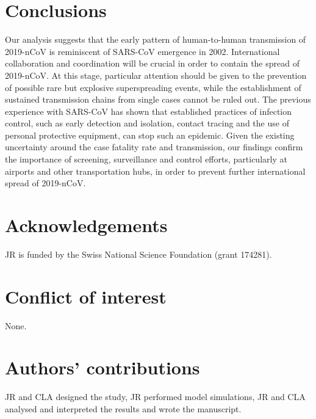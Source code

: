 \documentclass{article}
\begin{document}
\section*{Conclusions}
	
Our analysis suggests that the early pattern of human-to-human transmission of 2019-nCoV is reminiscent of SARS-CoV emergence in 2002. International collaboration and coordination will be crucial in order to contain the spread of 2019-nCoV. At this stage, particular attention should be given to the prevention of possible rare but explosive superspreading events, while the establishment of sustained transmission chains from single cases cannot be ruled out. The previous experience with SARS-CoV has shown that established practices of infection control, such as early detection and isolation, contact tracing and the use of personal protective equipment, can stop such an epidemic. Given the existing uncertainty around the case fatality rate and transmission, our findings confirm the importance of screening, surveillance and control efforts, particularly at airports and other transportation hubs, in order to prevent further international spread of 2019-nCoV.


\section*{Acknowledgements}
JR is funded by the Swiss National Science Foundation (grant 174281).
\section*{Conflict of interest}
None.

\section*{Authors' contributions}

JR and CLA designed the study, JR performed model simulations, JR and CLA analysed and interpreted the results and wrote the manuscript.


  
\end{document}
